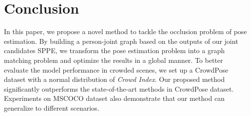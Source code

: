 \documentclass[10pt,twocolumn,letterpaper]{article}
\begin{document}
\vspace{-0.1in}
\section{Conclusion}
In this paper, we propose a novel method to tackle the occlusion problem of pose estimation. By building a person-joint graph based on the outputs of our joint candidates SPPE, we transform the pose estimation problem into a graph matching problem and optimize the results in a global manner. To better evaluate the model performance in crowded scenes, we set up a CrowdPose dataset with a normal distribution of \textit{Crowd Index}. Our proposed method significantly outperforms the state-of-the-art methods in CrowdPose dataset. Experiments on MSCOCO dataset also demonstrate that our method can generalize to different scenarios.

{\small


}
\end{document}
